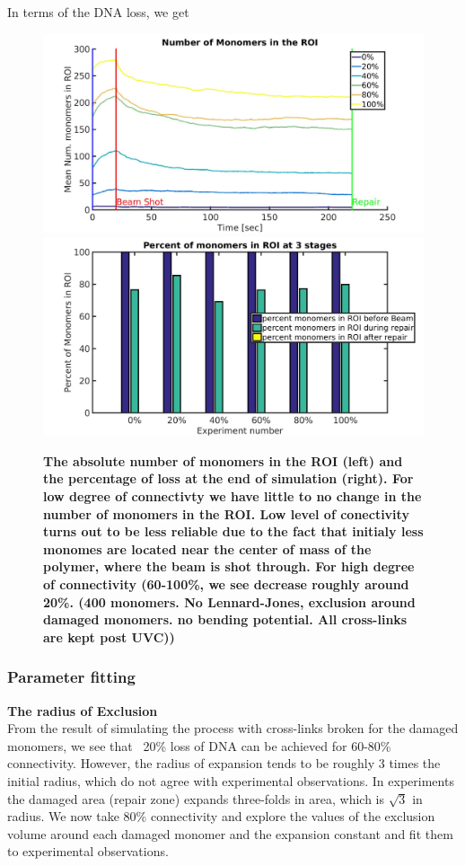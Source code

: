 \documentclass[12pt]{report}
\begin{document}
	In terms of the DNA loss, we get 	
	\begin{figure}[H]
	\includegraphics[width=0.5\linewidth, height=0.3\textheight]{Images/ExludeAroundDamagedMonomers/NoCrosslinksBroken/00/meanNumMonomersInROI}
	\includegraphics[width=0.5\linewidth, height=0.3\textheight]{Images/ExludeAroundDamagedMonomers/NoCrosslinksBroken/00/percentOfMonomersInROI}
	\caption{\tiny{\textbf{The absolute number of monomers in the ROI (left) and the percentage of loss at the end of simulation (right). For low degree of connectivty we have little to no change in the number of monomers in the ROI. Low level of conectivity turns out to be less reliable due to the fact that initialy less monomes are located near the center of mass of the polymer, where the beam is shot through. For high degree of connectivity (60-100\%, we see decrease roughly around 20\%. (400 monomers. No Lennard-Jones, exclusion around damaged monomers. no bending potential. All cross-links are kept post UVC)) }}}
	\label{fig:meanNumMonomersInROIVolumeOfExclusion}
	\end{figure}
	
	
	
  \subsubsection{Parameter fitting}
   \textbf{The radius of Exclusion} \\
  
   From the result of simulating the process with cross-links broken for the damaged monomers, we see that ~20\% loss of DNA can be achieved for 60-80\% connectivity. However, the radius of expansion tends to be roughly 3 times the initial radius, which do not agree with experimental observations. In experiments the damaged area (repair zone) expands three-folds in area, which is $\sqrt{3}$ in radius. We now take 80\% connectivity and explore the values of the exclusion volume around each damaged monomer and the expansion constant and fit them to experimental observations. 
   
\end{document}
